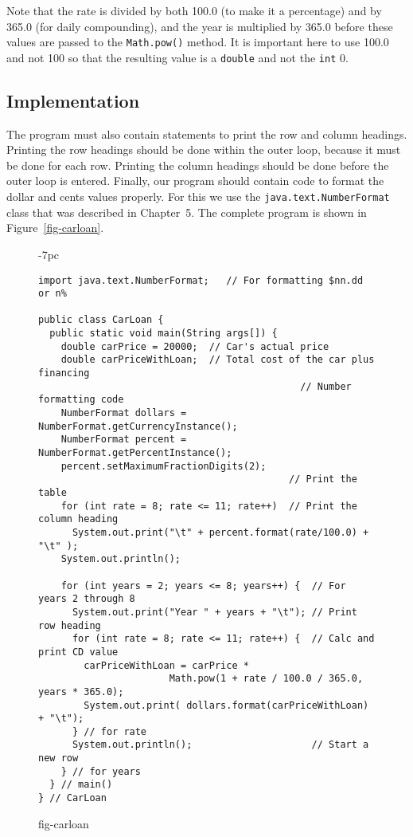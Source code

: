 \noindent Note that the rate is divided by both 100.0 (to make it
a percentage) and by 365.0 (for daily compounding), and the year
is multiplied by 365.0 before these values are passed to the
{\tt Math.pow()} method.   It is important here to use 100.0 and
not 100 so that the resulting value is a {\tt double} and not
the {\tt int} 0.

\subsection*{Implementation}
\noindent The program must also contain statements to print the row and column
headings.  Printing the row headings should be done within the outer
loop, because it must be done for each row.  Printing the column
headings should be done before the outer loop is entered.  Finally, our
program should contain code to format the dollar and cents values
properly.  For this we use the {\tt java.text.NumberFormat} class that
was described in Chapter~5. The complete program is shown in
Figure~\ref{fig-carloan}.
\begin{figure}[h]
\jjjprogstart
\begin{jjjlistingleft}[33pc]{-7pc}
\begin{lstlisting}
import java.text.NumberFormat;   // For formatting $nn.dd or n%

public class CarLoan {
  public static void main(String args[]) {
    double carPrice = 20000;  // Car's actual price
    double carPriceWithLoan;  // Total cost of the car plus financing
                                              // Number formatting code
    NumberFormat dollars = NumberFormat.getCurrencyInstance(); 
    NumberFormat percent = NumberFormat.getPercentInstance();
    percent.setMaximumFractionDigits(2);
                                            // Print the table
    for (int rate = 8; rate <= 11; rate++)  // Print the column heading
      System.out.print("\t" + percent.format(rate/100.0) + "\t" );
    System.out.println();

    for (int years = 2; years <= 8; years++) {  // For years 2 through 8
      System.out.print("Year " + years + "\t"); // Print row heading
      for (int rate = 8; rate <= 11; rate++) {  // Calc and print CD value
        carPriceWithLoan = carPrice * 
                       Math.pow(1 + rate / 100.0 / 365.0, years * 365.0);
        System.out.print( dollars.format(carPriceWithLoan)  + "\t");
      } // for rate
      System.out.println();                     // Start a new row
    } // for years
  } // main()
} // CarLoan
\end{lstlisting}
\end{jjjlistingleft}
{fig-carloan}
\end{figure}
\newpage
